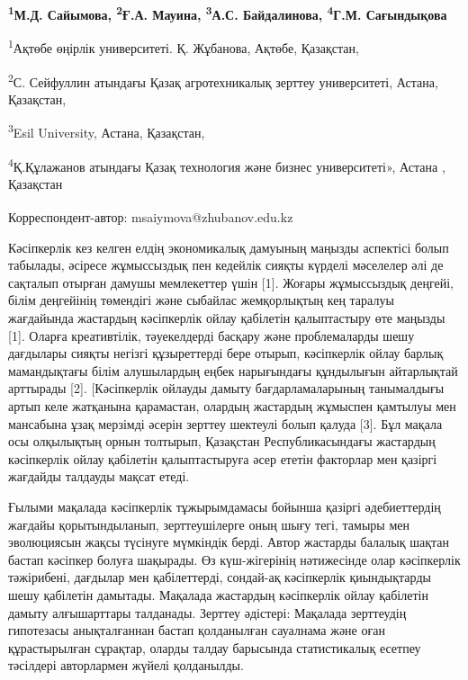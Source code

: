 
\begin{articleheader}

{\bfseries \textsuperscript{1}М.Д. Сайымова\textsuperscript{\envelope },
\textsuperscript{2}Ғ.А. Мауина, \textsuperscript{3}А.С. Байдалинова,
\textsuperscript{4}Г.М. Сағындықова}
\end{articleheader}
\begin{affiliation}
\textsuperscript{1}Ақтөбе өңірлік университеті. Қ. Жұбанова, Ақтөбе,
Қазақстан,

\textsuperscript{2}С. Сейфуллин атындағы Қазақ агротехникалық зерттеу
университеті, Астана, Қазақстан,

\textsuperscript{3}Esil University, Астана, Қазақстан,

\textsuperscript{4}Қ.Құлажанов атындағы Қазақ технология және бизнес
университеті», Астана , Қазақстан

\raggedright {\bfseries \textsuperscript{\envelope }}Корреспондент-автор: msaiymova@zhubanov.edu.kz
\end{affiliation}

Кәсіпкерлік кез келген елдің экономикалық дамуының маңызды аспектісі
болып табылады, әсіресе жұмыссыздық пен кедейлік сияқты күрделі
мәселелер әлі де сақталып отырған дамушы мемлекеттер үшін {[}1{]}.
Жоғары жұмыссыздық деңгейі, білім деңгейінің төмендігі және сыбайлас
жемқорлықтың кең таралуы жағдайында жастардың кәсіпкерлік ойлау
қабілетін қалыптастыру өте маңызды {[}1{]}. Оларға креативтілік,
тәуекелдерді басқару және проблемаларды шешу дағдылары сияқты негізгі
құзыреттерді бере отырып, кәсіпкерлік ойлау барлық мамандықтағы білім
алушылардың еңбек нарығындағы құндылығын айтарлықтай арттырады {[}2{]}.
{[}Кәсіпкерлік ойлауды дамыту бағдарламаларының танымалдығы артып келе
жатқанына қарамастан, олардың жастардың жұмыспен қамтылуы мен мансабына
ұзақ мерзімді әсерін зерттеу шектеулі болып қалуда {[}3{]}. Бұл мақала
осы олқылықтың орнын толтырып, Қазақстан Республикасындағы жастардың
кәсіпкерлік ойлау қабілетін қалыптастыруға әсер ететін факторлар мен
қазіргі жағдайды талдауды мақсат етеді.

Ғылыми мақалада кәсіпкерлік тұжырымдамасы бойынша қазіргі әдебиеттердің
жағдайы қорытындыланып, зерттеушілерге оның шығу тегі, тамыры мен
эволюциясын жақсы түсінуге мүмкіндік берді. Автор жастарды балалық
шақтан бастап кәсіпкер болуға шақырады. Өз күш-жігерінің нәтижесінде
олар кәсіпкерлік тәжірибені, дағдылар мен қабілеттерді, сондай-ақ
кәсіпкерлік қиындықтарды шешу қабілетін дамытады. Мақалада жастардың
кәсіпкерлік ойлау қабілетін дамыту алғышарттары талданады. Зерттеу
әдістері: Мақалада зерттеудің гипотезасы анықталғаннан бастап
қолданылған сауалнама және оған құрастырылған сұрақтар, оларды талдау
барысында статистикалық есетпеу тәсілдері авторлармен жүйелі қолданылды.

